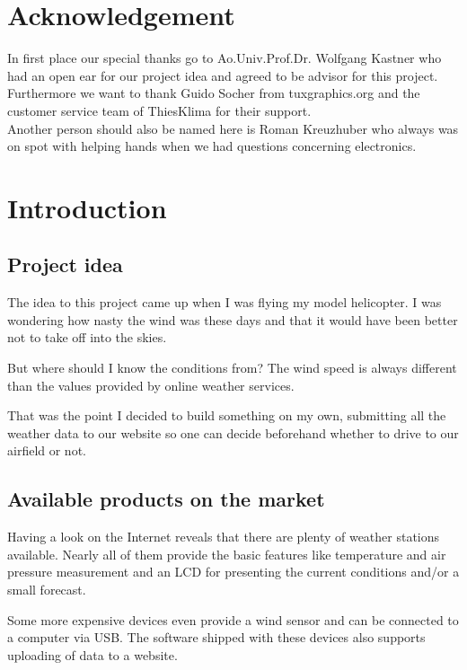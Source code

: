 
\chapter*{Acknowledgement}

In first place our special thanks go to Ao.Univ.Prof.Dr. Wolfgang Kastner who had an open ear for our project idea and agreed to be advisor for this project.\\[12pt]

\noindent Furthermore we want to thank Guido Socher from tuxgraphics.org and the customer service team of ThiesKlima for their support.\\[12pt]

\noindent Another person should also be named here is Roman Kreuzhuber who always was on spot with helping hands when we had questions concerning electronics. 

\chapter{Introduction}

\section{Project idea}
The idea to this project came up when I was flying my model helicopter. I was wondering how nasty the wind was these days and that it would have been better not to take off into the skies.

But where should I know the conditions from? The wind speed is always different than the values provided by online weather services.

That was the point I decided to build something on my own, submitting all the weather data to our website so one can decide beforehand whether to drive to our airfield or not.

\section{Available products on the market}
Having a look on the Internet reveals that there are plenty of weather stations available. Nearly all of them provide the basic features like temperature and air pressure measurement and an LCD for presenting the current conditions and/or a small forecast.

Some more expensive devices even provide a wind sensor and can be connected to a computer via USB. The software shipped with these devices also supports uploading of data to a website.

